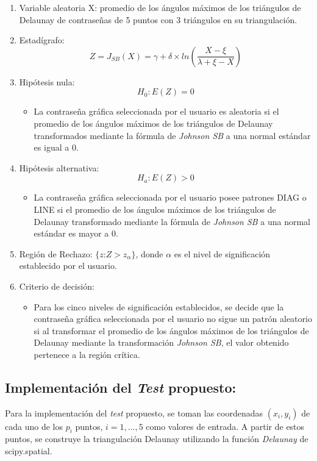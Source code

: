 \documentclass[12pt]{report}
\begin{document}
\begin{enumerate}
	\item Variable aleatoria X: promedio de los ángulos máximos de los triángulos de Delaunay de contraseñas de 5 puntos con 3 triángulos en su triangulación.
	\item Estadígrafo: \[
	Z= J_{SB}(X) =  \gamma + \delta \times ln\left(\frac{X - \xi}{\lambda + \xi - X}\right)
	\]

	\item Hipótesis nula: \[H_0:E(Z)=0\]
	\begin{itemize}
		\item La contraseña gráfica seleccionada por el usuario es aleatoria si el promedio de los ángulos máximos de los triángulos de Delaunay  transformados mediante la fórmula de \textit{Johnson SB} a una normal estándar es igual a 0.
	\end{itemize}
	
	
	\item Hipótesis alternativa: \[H_a:E(Z)>0\]
			\begin{itemize}
			\item La contraseña gráfica seleccionada por el usuario posee patrones DIAG o LINE  si el promedio de los ángulos máximos de los triángulos de Delaunay  transformado mediante la fórmula de \textit{Johnson SB} a una normal estándar es mayor a 0.
		\end{itemize}
	
	\item  Región de Rechazo: $\{z$:$Z>z_\alpha\}$, donde $\alpha$ es el nivel de significación establecido por el usuario. 
	
	\item Criterio de decisión:
	\begin{itemize}
		\item Para los cinco niveles de significación establecidos, se decide que la contraseña gráfica seleccionada por el usuario no sigue un patrón aleatorio si al transformar el promedio de los ángulos máximos de los triángulos de Delaunay mediante la transformación \textit{Johnson SB}, el valor obtenido pertenece a la región crítica. 
	\end{itemize}
	\end{enumerate}	 

\subsection{Implementación del \textit{Test} propuesto:}
Para la implementación del \textit{test} propuesto, se toman las coordenadas \((x_i, y_i)\) de cada uno de los \(p_i\) puntos, \(i = 1, \ldots, 5\) como valores de entrada. A partir de estos puntos, se construye la triangulación Delaunay utilizando la función \textit{Delaunay} de scipy.spatial.
\end{document}
